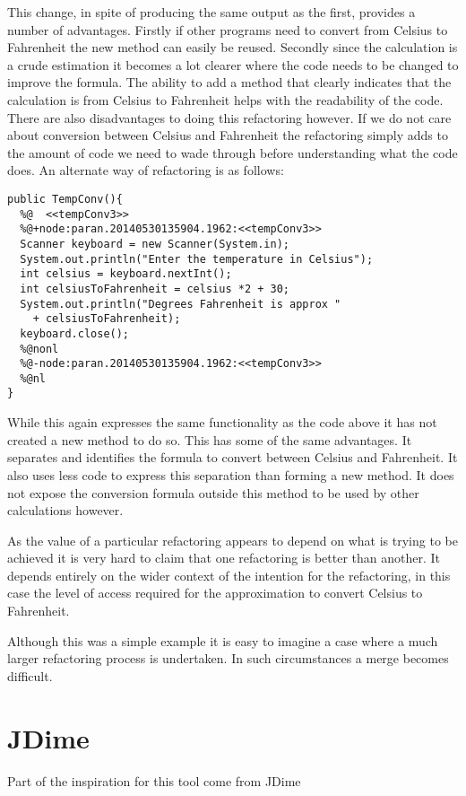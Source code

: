 This change, in spite of producing the same output as the first, provides a number of advantages. Firstly if other programs need to convert from Celsius to Fahrenheit the new method can easily be reused. Secondly since the calculation is a crude estimation it becomes a lot clearer where the code needs to be changed to improve the formula. The ability to add a method that clearly indicates that the calculation is from Celsius to Fahrenheit helps with the readability of the code. There are also disadvantages to doing this refactoring however. If we do not care about conversion between Celsius and Fahrenheit the refactoring simply adds to the amount of code we need to wade through before understanding what the code does. An alternate way of refactoring is as follows:

\begin{lstlisting}
public TempConv(){
  %@  <<tempConv3>>
  %@+node:paran.20140530135904.1962:<<tempConv3>>
  Scanner keyboard = new Scanner(System.in);
  System.out.println("Enter the temperature in Celsius");
  int celsius = keyboard.nextInt();
  int celsiusToFahrenheit = celsius *2 + 30;
  System.out.println("Degrees Fahrenheit is approx " 
    + celsiusToFahrenheit);
  keyboard.close();
  %@nonl
  %@-node:paran.20140530135904.1962:<<tempConv3>>
  %@nl
}
\end{lstlisting}

While this again expresses the same functionality as the code above it has not created a new method to do so. This has some of the same advantages. It separates and identifies the formula to convert between Celsius and Fahrenheit. It also uses less code to express this separation than forming a new method. It does not expose the conversion formula outside this method to be used by other calculations however.

As the value of a particular refactoring appears to depend on what is trying to be achieved it is very hard to claim that one refactoring is better than another. It depends entirely on the wider context of the intention for the refactoring, in this case the level of access required for the approximation to convert Celsius to Fahrenheit.

Although this was a simple example it is easy to imagine a case where a much larger refactoring process is undertaken. In such circumstances a merge becomes difficult. 

\section{JDime}
Part of the inspiration for this tool come from JDime

